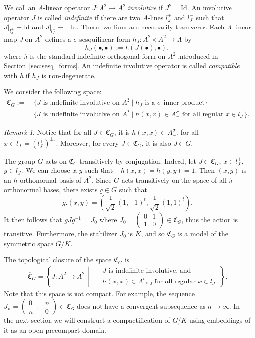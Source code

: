 \documentclass[oneside,11pt]{amsart}
\theoremstyle{definition}
\theoremstyle{remark}
\newtheorem{rem}[thm]{Remark}
\newcommand{\midwd}{\,\middle\vert\,}
\numberwithin{thm}{section}
\numberwithin{equation}{section}
\begin{document}
We call an $A$-linear operator $J\colon A^2\to A^2$ \emph{involutive} if $J^2=\mathrm{Id}$. An involutive operator $J$ is called \emph{indefinite} if there are two $A$-lines $l_J^+$ and $l_J^-$ such that $J|_{l_J^+}=\mathrm{Id}$ and $J|_{l_J^-}=-\mathrm{Id}$. These two lines are necessarily transverse. Each $A$-linear map $J$ on $A^2$ defines a $\sigma$-sesquilinear form $h_J\colon A^2\times A^2\to A$ by
$$h_J(\bullet,\bullet):=h(J(\bullet),\bullet),$$ 
where $h$ is the standard indefinite orthogonal form on $A^2$ introduced in Section~\ref{sec:sesq_forms}. An indefinite involutive operator is called \emph{compatible} with $h$ if $h_J$ is non-degenerate.

We consider the following space: 
\begin{align*}
\mathfrak{C}_G := &\; \{J\text{ is indefinite involutive on $A^2$} \mid h_J\text{ is a $\sigma$-inner product}\}\\
 = &\; \{J\text{ is indefinite involutive on $A^2$} \mid h(x,x)\in A^\sigma_+\text{ for all regular $x\in l_J^+$}\}.
\end{align*}
\begin{rem}
Notice that for all $J\in\mathfrak{C}_G$, it is $h(x,x)\in A^\sigma_-$, for all $x\in l_J^-=( l_J^+)^{\perp_h}$. Moreover, for every $J\in\mathfrak{C}_G$, it is also $J\in G$.
\end{rem}

The group $G$ acts on $\mathfrak{C}_G$ transitively by conjugation. Indeed, let $J\in \mathfrak{C}_G$, $x\in l^+_J$, $y\in l^-_J$. We can choose $x,y$ such that $-h(x,x)=h(y,y)=1$. Then $(x,y)$ is an $h$-orthonormal basis of $A^2$. Since $G$ acts transitively on the space of all $h$-orthonormal bases, there exists $g\in G$ such that 
\[g.(x,y)=\left(\frac{1}{\sqrt{2}}(1,-1)^t,\frac{1}{\sqrt{2}}(1,1)^t\right).\] 
It then follows that $gJg^{-1}=J_0$ where  $J_0=\begin{pmatrix}
0 & 1\\
1 & 0
\end{pmatrix}\in\mathfrak{C}_G$, thus the action is transitive. Furthermore, the stabilizer $J_0$ is $K$, and so $\mathfrak{C}_G$ is a model of the symmetric space $G/K$. 

The topological closure of the space $\mathfrak{C}_G$ is 
\begin{align*}
\overline{\mathfrak{C}}_G=\left\{J\colon A^2\to A^2\midwd
\begin{aligned}
&\ J\text{ is indefinite involutive, and }\\
&\ h(x,x)\in A^\sigma_{\geq 0} \text{ for all regular $x\in l_J^+$}
\end{aligned}
\right\}.
\end{align*}
Note that this space is not compact. For example, the sequence $J_n=\begin{pmatrix}
    0 & n \\
    n^{-1}  & 0
\end{pmatrix}\in\mathfrak{C}_G$ 
does not have a convergent subsequence as $n\to\infty$. In the next section we will construct a compactification of $G/K$ using embeddings of it as an open precompact domain.
\end{document}
